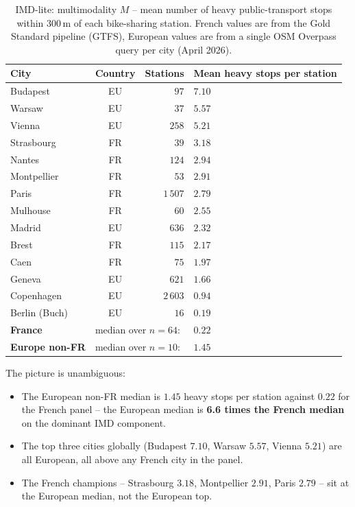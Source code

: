 \documentclass[11pt,a4paper]{article}
\begin{document}
\begin{table}[H]
\centering
\caption{IMD-lite: multimodality $M$ -- mean number of heavy
public-transport stops within 300\,m of each bike-sharing station.
French values are from the Gold Standard pipeline (GTFS),
European values are from a single OSM Overpass query per city
(April 2026).}
\label{tab:imd-lite-eu}
\small
\begin{tabular}{@{}lcrl@{}}
\toprule
City & Country & Stations & Mean heavy stops per station \\
\midrule
Budapest      & EU & $97$    & $7.10$ \\
Warsaw        & EU & $37$    & $5.57$ \\
Vienna        & EU & $258$   & $5.21$ \\
Strasbourg    & FR & $39$    & $3.18$ \\
Nantes        & FR & $124$   & $2.94$ \\
Montpellier   & FR & $53$    & $2.91$ \\
Paris         & FR & $1\,507$ & $2.79$ \\
Mulhouse      & FR & $60$    & $2.55$ \\
Madrid        & EU & $636$   & $2.32$ \\
Brest         & FR & $115$   & $2.17$ \\
Caen          & FR & $75$    & $1.97$ \\
Geneva        & EU & $621$   & $1.66$ \\
Copenhagen    & EU & $2\,603$ & $0.94$ \\
Berlin (Buch) & EU & $16$    & $0.19$ \\
\midrule
\textbf{France}        & \multicolumn{2}{l}{median over $n = 64$:} & $0.22$ \\
\textbf{Europe non-FR} & \multicolumn{2}{l}{median over $n = 10$:} & $1.45$ \\
\bottomrule
\end{tabular}
\end{table}

The picture is unambiguous:

\begin{itemize}
\item The European non-FR median is $1.45$ heavy stops per
station against $0.22$ for the French panel -- the European
median is \textbf{6.6 times the French median} on the dominant
IMD component.
\item The top three cities globally (Budapest $7.10$, Warsaw
$5.57$, Vienna $5.21$) are all European, all above any French
city in the panel.
\item The French champions -- Strasbourg $3.18$, Montpellier
$2.91$, Paris $2.79$ -- sit at the European median, not the
European top.
\end{itemize}
\end{document}
